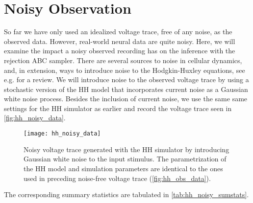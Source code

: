 


\section{Noisy Observation}

So far we have only used an idealized voltage trace, free of any noise, as the observed data. However, real-world neural data are quite noisy. Here, we will examine the impact a noisy observed recording has on the inference with the rejection ABC sampler. There are several sources to noise in cellular dynamics, and, in extension, ways to introduce noise to the Hodgkin-Huxley equations, see e.g. \cite{hh_noise} for a review. We will introduce noise to the observed voltage trace by using a stochastic version of the HH model that incorporates current noise as a Gaussian white noise process. Besides the inclusion of current noise, we use the same same settings for the HH simulator as earlier and record the voltage trace seen in \autoref{fig:hh_noisy_data}.
\begin{figure}[!htb]
    \centering
    \texttt{[image: hh\_noisy\_data]}
    \caption{Noisy voltage trace generated with the HH simulator by introducing Gaussian white noise to the input stimulus. The parametrization of the HH model and simulation parameters are identical to the ones used in preceding noise-free voltage trace (\autoref{fig:hh_obs_data}).}
    \label{fig:hh_noisy_data}
\end{figure} 
The corresponding summary statistics are tabulated in \autoref{tab:hh_noisy_sumstats}. 
